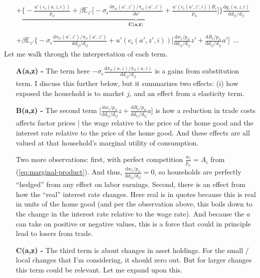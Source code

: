 \documentclass[12pt,pdftex]{article}
\begin{document}
\begin{onehalfspacing}
{\begin{align}
\nonumber \\
& + \underbrace{\bigg \{- \frac{u'(c_{i}(a,z,i))}{p_{ii}} + \beta \mathbb{E}_{z'} \bigg [-\sigma_{\epsilon} \frac{\partial \pi_{ii}(a',z') / \pi_{ii}(a',z')}{\partial a'} + \frac{u'(c_{i}(a',z',i))R_{i}}{p_{ii}} \bigg ] \bigg \}\frac{\mathrm{d} g_{i}(a,z,i)}{\mathrm{d} d_{ij} / d_{ij}}}_{\textbf{C(a,z)}} \\
\nonumber \\
& + \beta \mathbb{E}_{z'} \bigg \{ -\sigma_{\epsilon} \frac{\mathrm{d} \pi_{ii}(a',z') / \pi_{ii}(a',z')}{\mathrm{d}d_{ij} / d_{ij}} +  u'(c_{i}(a',z',i)) \bigg[ \frac{\mathrm{d} w_{i} / p_{ii}}{\mathrm{d} d_{ij} / d_{ij}}z'  +  \frac{\mathrm{d} R_{i} / p_{ii}}{\mathrm{d} d_{ij} / d_{ij}} a' \bigg] \ \  \ldots
\label{eq:apx-welfare-vterms}
\end{align}
}
Let me walk through the interpretation of each term.
\begin{itemize}
\item[\textbf{A(a,z) -}] The term here $-\sigma_{\epsilon} \frac{\mathrm{d} \pi_{ii}(a,z) / \pi_{ii}(a,z)}{\mathrm{d}d_{ij} / d_{ij}}$ is a gains from substitution term. I discuss this further below, but it summarizes two effects: (i) how exposed the household is to market $j$, and an effect from a elasticity term.

\item[\textbf{B(a,z) -}] The second term $\bigg[ \frac{\mathrm{d} w_{i} / p_{ii}}{\mathrm{d} d_{ij} / d_{ij}}z  +  \frac{\mathrm{d} R_{i} / p_{ii}}{\mathrm{d} d_{ij} / d_{ij}} a  \bigg]$ is how a reduction in trade costs affects factor prices | the wage relative to the price of the home good and the interest rate relative to the price of the home good. And these effects are all valued at that household's marginal utility of consumption.

    Two more observations: first, with perfect competition $\frac{w_i}{p_{ii}} = A_{i}$ from (\ref{eq:marginal-product}). And thus, $\frac{\mathrm{d} w_{i} / p_{ii}}{\mathrm{d} d_{ij} / d_{ij}} = 0$, so households are perfectly ``hedged'' from any effect on labor earnings. Second, there is an effect from how the ``real'' interest rate changes. Here real is in quotes because this is real in units of the home good (and per the observation above, this boils down to the change in the interest rate relative to the wage rate). And because the $a$ can take on positive or negative values, this is a force that could in principle lead to losers from trade.

\item[\textbf{C(a,z) -}]  The third term is about changes in asset holdings. For the small / local changes that I'm considering, it should zero out. But for larger changes this term could be relevant. Let me expand upon this.


\end{itemize}
\end{onehalfspacing}
\end{document}
